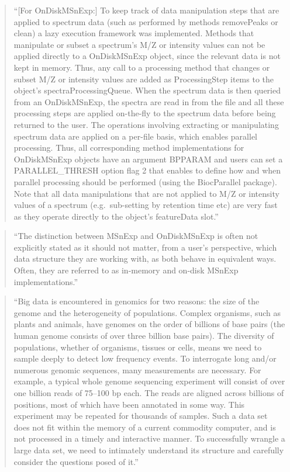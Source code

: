 \documentclass[]{tufte-book}
\begin{document}
\begin{quote}
``{[}For OnDiskMSnExp:{]} To keep track of data manipulation steps that are applied
to spectrum data (such as performed by methods removePeaks or clean) a lazy
execution framework was implemented. Methods that manipulate or subset a
spectrum's M/Z or intensity values can not be applied directly to a OnDiskMSnExp
object, since the relevant data is not kept in memory. Thus, any call to a
processing method that changes or subset M/Z or intensity values are added as
ProcessingStep items to the object's spectraProcessingQueue. When the spectrum
data is then queried from an OnDiskMSnExp, the spectra are read in from the file
and all these processing steps are applied on-the-fly to the spectrum data
before being returned to the user. The operations involving extracting or
manipulating spectrum data are applied on a per-file basis, which enables
parallel processing. Thus, all corresponding method implementations for
OnDiskMSnExp objects have an argument BPPARAM and users can set a
PARALLEL\_THRESH option flag 2 that enables to define how and when parallel
processing should be performed (using the BiocParallel package). Note that all
data manipulations that are not applied to M/Z or intensity values of a spectrum
(e.g.~sub-setting by retention time etc) are very fast as they operate directly
to the object's featureData slot.'' \citep{gatto2013msnbase}
\end{quote}

\begin{quote}
``The distinction between MSnExp and OnDiskMSnExp is often not explicitly
stated as it should not matter, from a user's perspective, which data structure
they are working with, as both behave in equivalent ways. Often, they are
referred to as in-memory and on-disk MSnExp implementations.''
\citep{gatto2013msnbase}
\end{quote}

\begin{quote}
``Big data is encountered in genomics for two reasons: the size of the genome
and the heterogeneity of populations. Complex organisms, such as plants and
animals, have genomes on the order of billions of base pairs (the human genome
consists of over three billion base pairs). The diversity of populations,
whether of organisms, tissues or cells, means we need to sample deeply to detect
low frequency events. To interrogate long and/or numerous genomic sequences,
many measurements are necessary. For example, a typical whole genome sequencing
experiment will consist of over one billion reads of 75--100 bp each. The reads
are aligned across billions of positions, most of which have been annotated in
some way. This experiment may be repeated for thousands of samples. Such a data
set does not fit within the memory of a current commodity computer, and is not
processed in a timely and interactive manner. To successfully wrangle a large
data set, we need to intimately understand its structure and carefully consider
the questions posed of it.'' \citep{lawrence2014scalable}
\end{quote}
\end{document}

